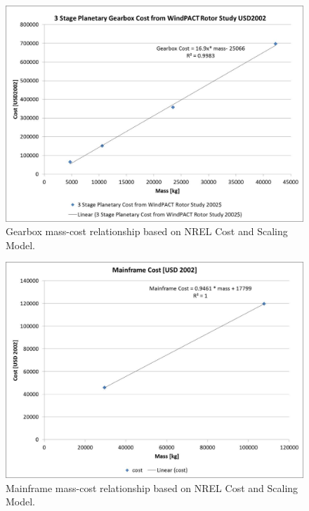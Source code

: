 \documentclass[letterpaper,10pt,openany,oneside]{sphinxmanual}
\begin{document}
\begin{figure}[htbp]
\centering
\capstart

\includegraphics[width=6.5in]{gearboxCost.pdf}
\caption{Gearbox mass-cost relationship based on NREL Cost and Scaling Model.}\label{theory:gearboxcost}\end{figure}
\begin{figure}[htbp]
\centering
\capstart

\includegraphics[width=6.5in]{mainframeCost.pdf}
\caption{Mainframe mass-cost relationship based on NREL Cost and Scaling Model.}\label{theory:mainframecost}\end{figure}
\end{document}
